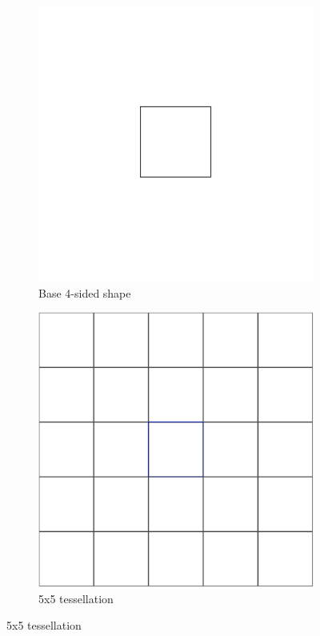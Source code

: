 \documentclass[12pt,letterpaper]{article}
\begin{document}
\begin{figure}[H]
    \begin{center}
        \caption{Tessellation of rectangle $\{4,4\}$}
        \label{fig:square}
        \begin{subfigure}[b]{.3\linewidth}
            \includegraphics[width=\linewidth]{base-square}
            \caption{Base 4-sided shape}
        \end{subfigure}
        \begin{subfigure}[b]{.3\linewidth}
            \includegraphics[width=\linewidth]{tes-square}
            \caption{5x5 tessellation}
        \end{subfigure}
    \end{center}
\end{figure}
\end{document}
